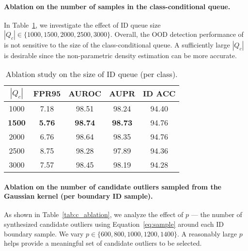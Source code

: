 \paragraph{Ablation on the number of samples in the class-conditional queue.}  In Table~\ref{tab:q_ablation}, we investigate the effect of ID queue size $|Q_c| \in \{1000, 1500, 2000, 2500, 3000\}$. Overall,  the OOD detection performance of \model is not sensitive to the size of the class-conditional queue.  A sufficiently large $|Q_c|$ is desirable since the non-parametric density estimation can be more accurate.
\begin{table}[htbp]
  \centering
      \small 
   \vspace{-1em}
  \caption{Ablation study on the size of ID queue (per class).}
    \begin{tabular}{c|cccc}
    \toprule
   $|Q_c|$ & FPR95 & AUROC & AUPR  & ID  ACC  \\
    \midrule
    1000  & 7.18  & 98.51  & 98.24  & 94.40  \\
    \textbf{1500}  & \textbf{5.76}  & \textbf{98.74}   & \textbf{98.73}  &  94.76  \\
    2000  & 6.76  & 98.64  & 98.35  & 94.76 \\
    2500  & 8.75  & 98.28  & 97.89  & 94.36  \\
    3000  & 7.57  & 98.45  & 98.19  & 94.28  \\
    \bottomrule
    \end{tabular}\label{tab:q_ablation}\end{table}



\vspace{-0.2cm}
  \paragraph{Ablation on the number of candidate outliers sampled from the Gaussian kernel (per boundary ID sample).} As shown in Table~\ref{tab:c_ablation}, we analyze the effect of $p$ --- the number of synthesized candidate outliers using Equation~\ref{eq:sample} around each ID boundary sample. We vary $p \in \{600,800,1000,1200,1400\}$. A reasonably large $p$ helps provide a meaningful set of candidate outliers to be selected.


